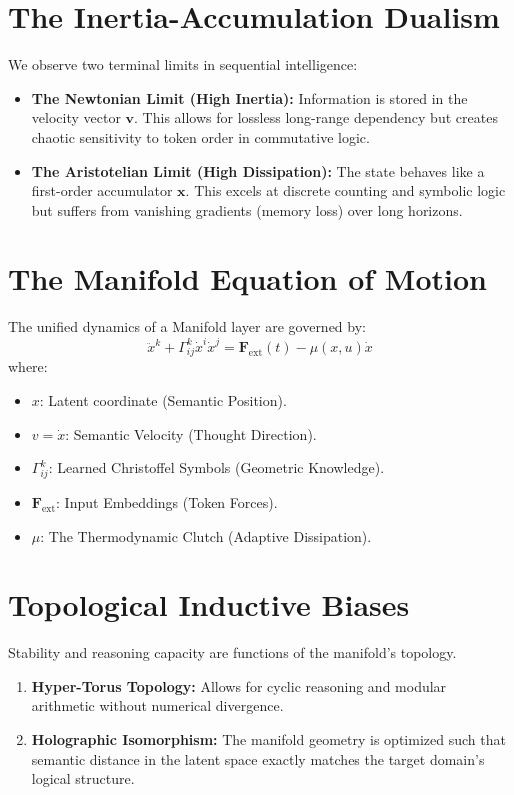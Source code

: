 \documentclass[11pt,a4paper]{report}
\begin{document}
\section{The Inertia-Accumulation Dualism}
We observe two terminal limits in sequential intelligence:
\begin{itemize}
    \item \textbf{The Newtonian Limit (High Inertia):} Information is stored in the velocity vector $\mathbf{v}$. This allows for lossless long-range dependency but creates chaotic sensitivity to token order in commutative logic.
    \item \textbf{The Aristotelian Limit (High Dissipation):} The state behaves like a first-order accumulator $\mathbf{x}$. This excels at discrete counting and symbolic logic but suffers from vanishing gradients (memory loss) over long horizons.
\end{itemize}

\section{The Manifold Equation of Motion}
The unified dynamics of a Manifold layer are governed by:
\begin{equation}
    \ddot{x}^k + \Gamma^k_{ij} \dot{x}^i \dot{x}^j = \mathbf{F}_{\text{ext}}(t) - \mu(x, u) \dot{x}
\end{equation}
where:
\begin{itemize}
    \item $x$: Latent coordinate (Semantic Position).
    \item $v = \dot{x}$: Semantic Velocity (Thought Direction).
    \item $\Gamma^k_{ij}$: Learned Christoffel Symbols (Geometric Knowledge).
    \item $\mathbf{F}_{\text{ext}}$: Input Embeddings (Token Forces).
    \item $\mu$: The Thermodynamic Clutch (Adaptive Dissipation).
\end{itemize}

\section{Topological Inductive Biases}
Stability and reasoning capacity are functions of the manifold's topology.
\begin{enumerate}
    \item \textbf{Hyper-Torus Topology:} Allows for cyclic reasoning and modular arithmetic without numerical divergence.
    \item \textbf{Holographic Isomorphism:} The manifold geometry is optimized such that semantic distance in the latent space exactly matches the target domain's logical structure.
\end{enumerate}
\end{document}
